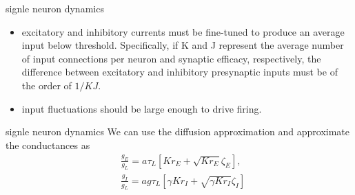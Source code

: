 \documentclass{beamer}
\begin{document}
\begin{frame}{signle neuron dynamics}
	\begin{itemize}
		\item excitatory and inhibitory currents must be fine-tuned to produce an average input below threshold. Specifically, if K and J represent the average number of input connections per neuron and synaptic efficacy, respectively, the difference between excitatory and inhibitory presynaptic inputs must be of the order of $1/KJ$.
		\item input fluctuations should be large enough to drive firing.
	\end{itemize}
\end{frame}

\begin{frame}{signle neuron dynamics}
	We can use the diffusion approximation and approximate the conductances as
	\begin{equation}
		\begin{aligned}
			&\frac{g_{E}}{g_{L}}=a \tau_{L}\left[K r_{E}+\sqrt{K r_{E}} \zeta_{E}\right], \\
			&\frac{g_{I}}{g_{L}}=a g \tau_{L}\left[\gamma K r_{I}+\sqrt{\gamma K r_{I}} \zeta_{I}\right]
		\end{aligned}
	\end{equation}
\end{frame}
\end{document}
